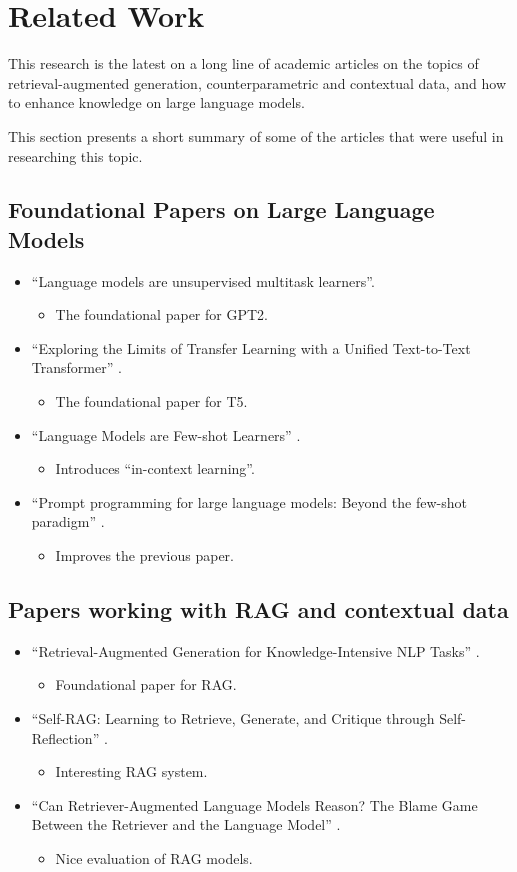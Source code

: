 \section{Related Work}

This research is the latest on a long line of academic articles on the topics of retrieval-augmented generation, counterparametric and contextual data, and how to enhance knowledge on large language models.

This section presents a short summary of some of the articles that were useful in researching this topic.


\subsection{Foundational Papers on Large Language Models}
\newcommand{\mart}[1]{\begin{itemize} \item #1 \end{itemize}}
\begin{itemize}
	\item ``Language models are unsupervised multitask learners''\citep{gpt2}.
		\mart{The foundational paper for GPT2.}
	\item ``Exploring the Limits of Transfer Learning with a Unified Text-to-Text Transformer'' \citep{t5}.
		\mart{The foundational paper for T5.}
	\item ``Language Models are Few-shot Learners'' \citep{fewshotlearners}.
		\mart{Introduces ``in-context learning''.}
	\item ``Prompt programming for large language models: Beyond the few-shot paradigm'' \citep{beyondfewshot}.
		\mart{Improves the previous paper.}
\end{itemize}

\subsection{Papers working with RAG and contextual data}
\begin{itemize}
	\item ``Retrieval-Augmented Generation for Knowledge-Intensive NLP Tasks'' \citep{rag}.
		\mart{Foundational paper for RAG.}
	\item ``Self-RAG: Learning to Retrieve, Generate, and Critique through Self-Reflection'' \citep{selfrag}.
		\mart{Interesting RAG system.}
	\item ``Can Retriever-Augmented Language Models Reason? The Blame Game Between the Retriever and the Language Model'' \citep{can_rag_models_reason}.
		\mart{Nice evaluation of RAG models.}
\end{itemize}

